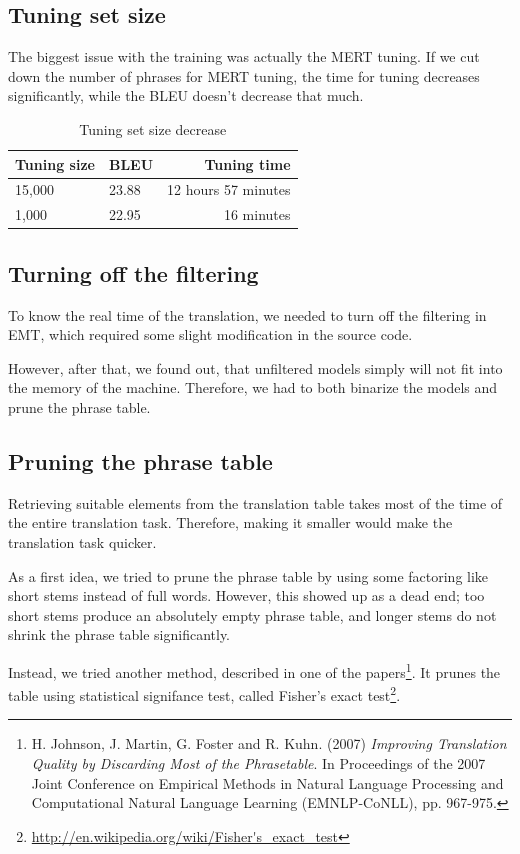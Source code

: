 \subsection{Tuning set size}
The biggest issue with the training was actually the MERT tuning. If we cut down the number of phrases for MERT tuning, the time for tuning decreases significantly, while the BLEU doesn't decrease that much.
\begin{table}[h]
\begin{center}
\begin{tabular}{|l|l|r|}
    \hline
    \textbf{Tuning size} & \textbf{BLEU} & \textbf{Tuning time} \\ \hline
    15,000 & 23.88 & 12 hours 57 minutes \\ \hline
    1,000 & 22.95 & 16 minutes \\  \hline
\end{tabular}
\end{center}

\caption{Tuning set size decrease}\label{moses:initialresults}
\end{table}

\subsection{Turning off the filtering}
To know the real time of the translation, we needed to turn off the filtering in EMT, which required some slight modification in the source code. 

However, after that, we found out, that unfiltered models simply will not fit into the memory of the machine. Therefore, we had to both binarize the models and prune the phrase table.

\subsection{Pruning the phrase table}
Retrieving suitable elements from the translation table takes most of the time of the entire translation task. Therefore, making it smaller would make the translation task quicker.

As a first idea, we tried to prune the phrase table by using some factoring like short stems instead of full words. However, this showed up as a dead end; too short stems produce an absolutely empty phrase table, and longer stems do not shrink the phrase table significantly.

Instead, we tried another method, described in one of the papers\footnote{H. Johnson, J. Martin, G. Foster and R. Kuhn. (2007) \emph{Improving Translation Quality by Discarding Most of the Phrasetable}. In Proceedings of the 2007 Joint Conference on Empirical Methods in Natural Language Processing and Computational Natural Language Learning (EMNLP-CoNLL), pp. 967-975.}. It prunes the table using statistical signifance test, called Fisher's exact test\footnote{\url{http://en.wikipedia.org/wiki/Fisher's_exact_test}}. 

